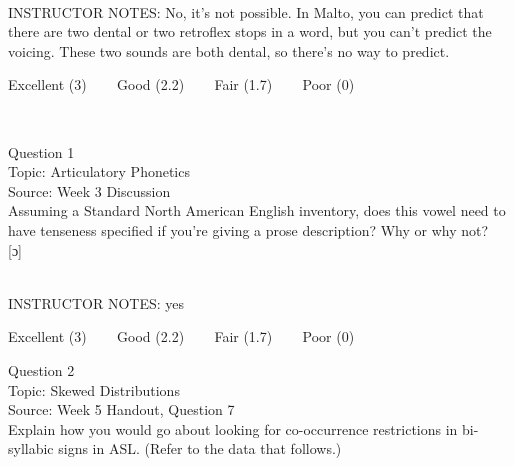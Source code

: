 \documentclass[12pt]{article}
\begin{document}
~\\
INSTRUCTOR NOTES: No, it's not possible. In Malto, you can predict that there are two dental or two retroflex stops in a word, but you can't predict the voicing. These two sounds are both dental, so there's no way to predict.


\vfill
Excellent (3) ~~~ Good (2.2) ~~~ Fair (1.7) ~~~ Poor (0)
\newpage

\begin{center}
\textbf{{\color{red}{\HUGE END OF EXAM}}}\\

\end{center}
\newpage

\begin{center}
\textbf{{\color{blue}{\HUGE START OF EXAM\\}}}

\textbf{{\color{blue}{\HUGE Student ID: 94549\\}}}

\textbf{{\color{blue}{\HUGE 4:10\\}}}

\end{center}
\newpage

{\large Question 1}\\

Topic: Articulatory Phonetics\\
Source: Week 3 Discussion\\

Assuming a Standard North American English inventory, does this vowel need to have tenseness specified if you're giving a prose description? Why or why not?\\

{[ɔ]}


~\\
INSTRUCTOR NOTES: yes


\vfill
Excellent (3) ~~~ Good (2.2) ~~~ Fair (1.7) ~~~ Poor (0)
\newpage

{\large Question 2}\\

Topic: Skewed Distributions\\
Source: Week 5 Handout, Question 7\\

Explain how you would go about looking for co-occurrence restrictions in bi-syllabic signs in ASL. (Refer to the data that follows.)\\
\end{document}
